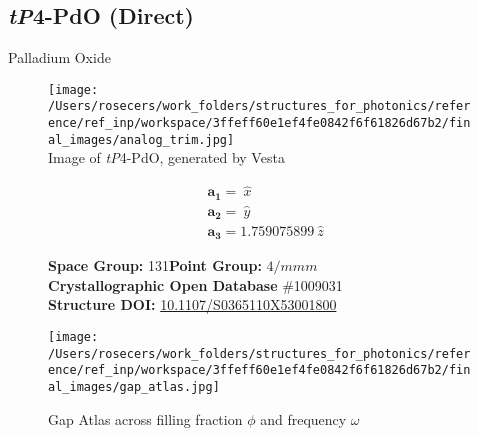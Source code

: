 \subsection{\large{\textit{tP}4-PdO (Direct)}}\vspace{-0.1in}
Palladium Oxide


\begin{figure}[H]
\begin{minipage}{0.34\textwidth}\centering
\texttt{[image: /Users/rosecers/work\_folders/structures\_for\_photonics/reference/ref\_inp/workspace/3ffeff60e1ef4fe0842f6f61826d67b2/final\_images/analog\_trim.jpg]}\\
\small{Image of \textit{tP}4-PdO, generated by Vesta}
\end{minipage}\hfill
\begin{minipage}{0.65\textwidth}\raggedright
{\setlength{\mathindent}{0cm}
\begin{equation*}
\begin{split}&\boldsymbol{a_1} = \ \hat{x}\\[-8pt]
&\boldsymbol{a_2} = \ \hat{y}\\[-8pt]
&\boldsymbol{a_3} = 1.759075899\ \hat{z}
\end{split}
\end{equation*}}

\textbf{Space Group:}	131\hspace{0.5in}\textbf{Point Group:}	$4/mmm$\\
\textbf{Crystallographic Open Database} \#1009031\\
\textbf{Structure DOI: }\url{10.1107/S0365110X53001800}

\end{minipage}\hfill
\end{figure}
\vspace{-0.25in}


\begin{figure}[H]
\begin{minipage}{0.9\textwidth}\centering
\texttt{[image: /Users/rosecers/work\_folders/structures\_for\_photonics/reference/ref\_inp/workspace/3ffeff60e1ef4fe0842f6f61826d67b2/final\_images/gap\_atlas.jpg]}
\\
\end{minipage}\hfill\caption{Gap Atlas across filling fraction $\phi$ and frequency $\omega$}
\end{figure}


